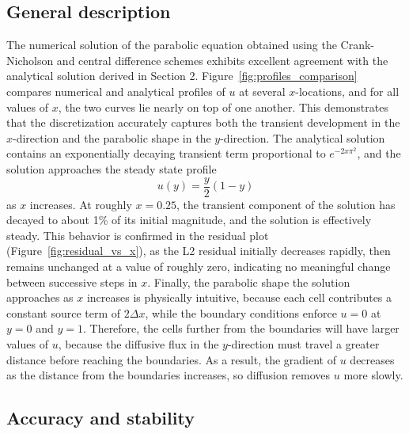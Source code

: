 \documentclass[letterpaper,12pt]{article}
\begin{document}
\subsection{General description}

The numerical solution of the parabolic equation obtained using the Crank-Nicholson and central difference schemes exhibits excellent agreement with the analytical solution derived in Section 2. Figure~\ref{fig:profiles_comparison} compares numerical and analytical profiles of $u$ at several $x$-locations, and for all values of $x$, the two curves lie nearly on top of one another. This demonstrates that the discretization accurately captures both the transient development in the $x$-direction and the parabolic shape in the $y$-direction. The analytical solution contains an exponentially decaying transient term proportional to $e^{-2 x \pi^2}$, and the solution approaches the steady state profile
\begin{equation}
u(y) = \frac{y}{2} (1-y)
\end{equation}
as $x$ increases. At roughly $x = 0.25$, the transient component of the solution has decayed to about 1\% of its initial magnitude, and the solution is effectively steady. This behavior is confirmed in the residual plot (Figure~\ref{fig:residual_vs_x}), as the L2 residual initially decreases rapidly, then remains unchanged at a value of roughly zero, indicating no meaningful change between successive steps in $x$. Finally, the parabolic shape the solution approaches as $x$ increases is physically intuitive, because each cell contributes a constant source term of $2 \Delta x$, while the boundary conditions enforce $u=0$ at $y=0$ and $y=1$. Therefore, the cells further from the boundaries will have larger values of $u$, because the diffusive flux in the $y$-direction must travel a greater distance before reaching the boundaries. As a result, the gradient of $u$ decreases as the distance from the boundaries increases, so diffusion removes $u$ more slowly.

\subsection{Accuracy and stability}
\end{document}
